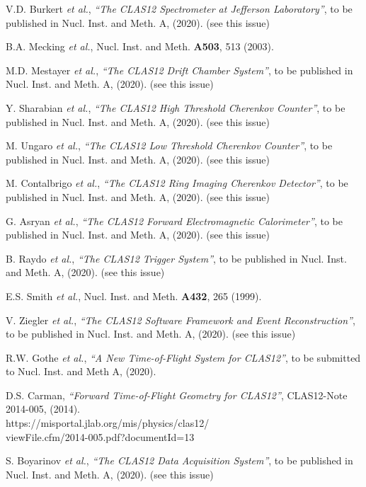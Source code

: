 \documentclass[3p,times,twocolumn]{elsarticle}
\begin{document}
\begin{thebibliography}{99}

V.D. Burkert {\it et al.}, {\it ``The CLAS12 Spectrometer at Jefferson Laboratory''}, to be published in
Nucl. Inst. and Meth. A, (2020). (see this issue)
  
B.A. Mecking {\it et al.}, Nucl. Inst. and Meth. {\bf A503}, 513 (2003).

M.D. Mestayer {\it et al.}, {\it ``The CLAS12 Drift Chamber System''}, to be published in Nucl. Inst.
and Meth. A, (2020). (see this issue)

Y. Sharabian {\it et al.}, {\it ``The CLAS12 High Threshold Cherenkov Counter''}, to be published in Nucl. Inst.
and Meth. A, (2020). (see this issue)
  
M. Ungaro {\it et al.}, {\it ``The CLAS12 Low Threshold Cherenkov Counter''}, to be published in Nucl. Inst.
and Meth. A, (2020). (see this issue)
  
M. Contalbrigo {\it et al.}, {\it ``The CLAS12 Ring Imaging Cherenkov Detector''}, to be published in Nucl. Inst.
and Meth. A, (2020). (see this issue)

G. Asryan {\it et al.}, {\it ``The CLAS12 Forward Electromagnetic Calorimeter''}, to be published in Nucl. Inst.
and Meth. A, (2020). (see this issue)

B. Raydo {\it et al.}, {\it ``The CLAS12 Trigger System''}, to be published in Nucl. Inst. and Meth. A, (2020).
(see this issue)
  
E.S. Smith {\it et al.}, Nucl. Inst. and Meth. {\bf A432}, 265 (1999).

V. Ziegler {\it et al.}, {\it ``The CLAS12 Software Framework and Event Reconstruction''}, to be published in
Nucl. Inst. and Meth. A, (2020). (see this issue)

R.W. Gothe {\it et al.}, {\it ``A New Time-of-Flight System for CLAS12''}, to be submitted to Nucl. Inst.
and Meth A, (2020).

D.S. Carman, {\it ``Forward Time-of-Flight Geometry for CLAS12''}, CLAS12-Note 2014-005, (2014). \\
https://misportal.jlab.org/mis/physics/clas12/\\ viewFile.cfm/2014-005.pdf?documentId=13

S. Boyarinov {\it et al.}, {\it ``The CLAS12 Data Acquisition System''}, to be published in Nucl. Inst. and
Meth. A, (2020). (see this issue)


\end{thebibliography}
\end{document}
